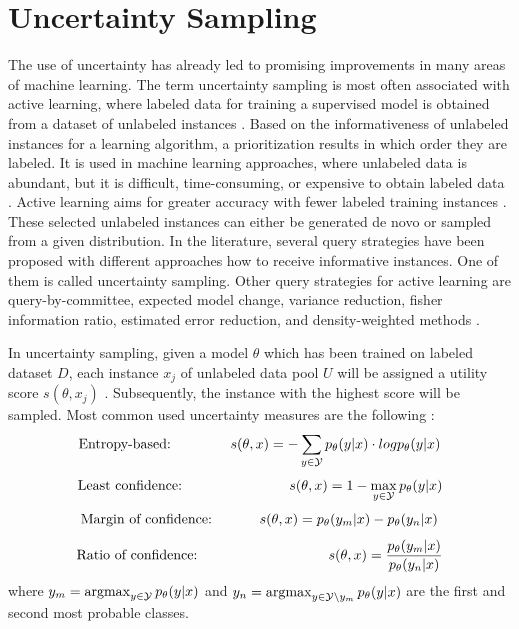 \section{Uncertainty Sampling} 
\label{sec:uncertaintysampling}
%
The use of uncertainty has already led to promising improvements in many areas of machine learning.
The term uncertainty sampling is most often associated with active learning, where labeled data for training a supervised model is obtained from a dataset of unlabeled instances \cite{Settles2009ActiveLL}.
Based on the informativeness of unlabeled instances for a learning algorithm, a prioritization results in which order they are labeled.
It is used in machine learning approaches, where unlabeled data is abundant, but it is difficult, time-consuming, or expensive to obtain labeled data \cite{Settles2009ActiveLL}.
Active learning aims for greater accuracy with fewer labeled training instances \cite{Settles2009ActiveLL}.
These selected unlabeled instances can either be generated de novo or sampled from a given distribution.
In the literature, several query strategies have been proposed with different approaches how to receive informative instances.
One of them is called uncertainty sampling.
Other query strategies for active learning are query-by-committee, expected model change, variance reduction, fisher information ratio, estimated error reduction, and density-weighted methods \cite{Settles2009ActiveLL}.

In uncertainty sampling, given a model $\theta$ which has been trained on labeled dataset $D$, each instance $x_j$ of unlabeled data pool $U$ will be assigned a utility score $s(\theta, x_j)$ \cite{nguyen2021howtomeasure}.
Subsequently, the instance with the highest score will be sampled.
Most common used uncertainty measures are the following \cite{human-in-the-loop}:
\begin{equation}
    \text{Entropy-based:}\hspace{15mm} \label{eqn:entropy_def}
     s(\theta, x) = - \sum_{y \in \mathcal{Y}}{p_{\theta}(y | x) \cdot log p_{\theta}(y|x)}
\end{equation}
\begin{equation}
    \text{Least confidence:}\hspace{27mm} \label{eqn:least_confidence_def}
     s(\theta, x) = 1 - \max_{y \in \mathcal{Y}}{p_{\theta}(y | x)}
\end{equation}
\begin{equation}
    \text{Margin of confidence:}\hspace{12mm} \label{eqn:margin_of_confidence_def}
    s(\theta, x) = p_{\theta}(y_m | x) - p_{\theta}(y_n|x)
\end{equation}
\begin{equation} \label{eqn:ratio_of_confidence_def}
    \text{Ratio of confidence:}\hspace{33mm}
    s(\theta, x) = \frac{p_{\theta}(y_m | x)}{p_{\theta}(y_n|x)}
\end{equation}
where
$y_m = \operatorname*{argmax}_{y \in \mathcal{Y}} p_{\theta}(y | x)$ 
and 
$y_n = \operatorname*{argmax}_{y \in \mathcal{Y} \setminus y_m}{p_{\theta}(y | x)}$ are the first and second most probable classes.

